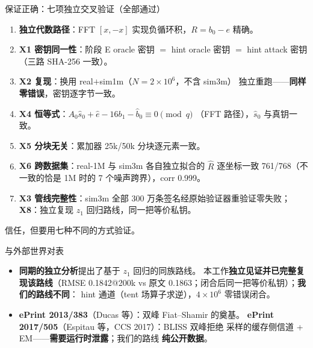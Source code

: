 \documentclass[11pt,aspectratio=169]{ctexbeamer}
\begin{document}
\begin{frame}{保证正确：七项独立交叉验证（全部通过）}
  \small
  \begin{enumerate}
    \item \textbf{独立代数路径}：FFT $[x,-x]$ 实现负循环积，$R=b_0-e$ 精确。
    \item \textbf{X1 密钥同一性}：阶段 E oracle 密钥 $=$ hint oracle 密钥
          $=$ hint attack 密钥（三路 SHA-256 一致）。
    \item \textbf{X2 复现}：换用 real$+$sim1m（$N=2\times10^6$，不含 sim3m）
          独立重跑——\textbf{同样零错误}，密钥逐字节一致。
    \item \textbf{X4 恒等式}：$A_0\hat s_0+\hat e-16b_1-\hat b_0\equiv0\pmod q$
          （FFT 路径），$\hat s_0$ 与真钥一致。
    \item \textbf{X5 分块无关}：累加器 25k/50k 分块逐元素一致。
    \item \textbf{X6 跨数据集}：real-1M 与 sim3m 各自独立拟合的 $\hat R$
          逐坐标一致 761/768（不一致的恰是 1M 时的 7 个噪声跨界），corr 0.999。
    \item \textbf{X3 管线完整性}：sim3m 全部 300 万条签名经原始验证器重验证零失败；
          \textbf{X8}：独立复现 $z_1$ 回归路线，同一把等价私钥。
  \end{enumerate}
  \begin{center}
    {\color{ravbronze}\small 信任，但要用七种不同的方式验证。}
  \end{center}
\end{frame}

\begin{frame}{与外部世界对表}
  \begin{itemize}
    \item \textbf{同期的独立分析}提出了基于 $z_1$ 回归的同族路线。
          本工作\textbf{独立见证并已完整复现该路线}（RMSE 0.1842@200k vs 原文
          0.1863；闭合后同一把等价私钥）；\textbf{我们的路线不同}：
          hint 通道（tent 场算子求逆），$4\times10^6$ 零错误闭合。
        \item \textbf{ePrint 2013/383}（Ducas 等）：双峰 Fiat--Shamir 的奠基。
          \textbf{ePrint 2017/505}（Espitau 等，CCS 2017）：BLISS 双峰拒绝
          采样的缓存侧信道 + EM——\textbf{需要运行时泄露}；我们的路线
          \textbf{纯公开数据}。
  \end{itemize}
\end{frame}
\end{document}
